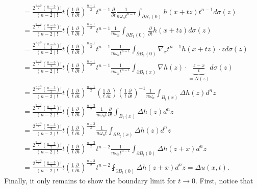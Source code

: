 \documentclass[A4,12pt,twoside]{book}
\begin{document}
{\begin{align*}
        &=  \frac{2^{\frac{n-3}{2}} (\frac{n-3}{2})!}{(n-2)!} t \left( \frac{1}{t} \frac{\partial}{\partial t} \right)^{\frac{n-1}{2}}   t^{n-1} \frac{\partial}{\partial t}\frac{1}{n \omega_n t^{n-1}} \int_{\partial B_1 (0)} h(x+tz) t^{n-1} d\sigma (z) \\
        &=  \frac{2^{\frac{n-3}{2}} (\frac{n-3}{2})!}{(n-2)!} t \left( \frac{1}{t} \frac{\partial}{\partial t} \right)^{\frac{n-1}{2}}   t^{n-1} \frac{1}{n \omega_n } \int_{\partial B_1 (0)} \frac{\partial}{\partial t} h(x+tz)  d\sigma (z) \\
        &=  \frac{2^{\frac{n-3}{2}} (\frac{n-3}{2})!}{(n-2)!} t \left( \frac{1}{t} \frac{\partial}{\partial t} \right)^{\frac{n-1}{2}}   t^{n-1} \frac{1}{n \omega_n t^{n-1} } \int_{\partial B_1 (0)} \nabla_x t^{n-1} h(x+tz) \cdot z  d\sigma (z) \\
        &=  \frac{2^{\frac{n-3}{2}} (\frac{n-3}{2})!}{(n-2)!} t \left( \frac{1}{t} \frac{\partial}{\partial t} \right)^{\frac{n-1}{2}}   t^{n-1} \frac{1}{n \omega_n t^{n-1} } \int_{\partial B_t (x)}  \nabla h(z) \cdot \underbrace{\frac{z-x}{t}}_{=N(z)}  d\sigma (z) \\
        &= \frac{2^{\frac{n-3}{2}} (\frac{n-3}{2})!}{(n-2)!} t \left( \frac{1}{t} \frac{\partial}{\partial t} \right)^{\frac{n-1}{2}} \left( \frac{1}{t} \frac{\partial}{\partial t} \right) \left( \frac{1}{t} \frac{\partial}{\partial t} \right)^{-1}  \frac{1}{n \omega_n  } \int_{ B_t (x)} \Delta h(z) d^n z \\
         &= \frac{2^{\frac{n-3}{2}} (\frac{n-3}{2})!}{(n-2)!} t \left( \frac{1}{t} \frac{\partial}{\partial t} \right)^{\frac{n-3}{2}}   \frac{1}{n \omega_n t } \frac{\partial}{\partial t} \int_{ B_t (x)} \Delta h(z) d^n z\\
         &= \frac{2^{\frac{n-3}{2}} (\frac{n-3}{2})!}{(n-2)!} t \left( \frac{1}{t} \frac{\partial}{\partial t} \right)^{\frac{n-3}{2}}   \frac{1}{n \omega_n t }  \int_{ \partial B_t (x)} \Delta h(z) d^n z\\
        &= \frac{2^{\frac{n-3}{2}} (\frac{n-3}{2})!}{(n-2)!} t \left( \frac{1}{t} \frac{\partial}{\partial t} \right)^{\frac{n-3}{2}} t^{n-2}  \frac{1}{n \omega_n t^{n-1} }  \int_{ \partial B_t (0)} \Delta h(z+x) d^n z\\
        &= \frac{2^{\frac{n-3}{2}} (\frac{n-3}{2})!}{(n-2)!} t \left( \frac{1}{t} \frac{\partial}{\partial t} \right)^{\frac{n-3}{2}} t^{n-2}   \fint_{ \partial B_t (0)} \Delta h(z+x) d^n z = \Delta u(x,t).
    \end{align*}
    Finally, it only remains to show the boundary limit for $t \to 0$. First, notice that 
}
\end{document}
